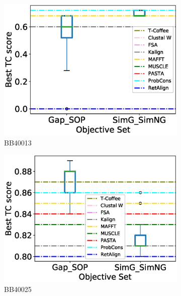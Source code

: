 \begin{figure}[!htbp]
\begin{adjustwidth}{-1.5cm}{-1cm}
\begin{subfigure}{0.22\textwidth}
			\includegraphics[width=\columnwidth]{Figure/summary/precomputedInit/Balibase/BB40013_objset_tc_rank_2}
			\caption{BB40013}
		\end{subfigure}
		\begin{subfigure}{0.22\textwidth}
			\includegraphics[width=\columnwidth]{Figure/summary/precomputedInit/Balibase/BB40025_objset_tc_rank_2}
			\caption{BB40025}
		\end{subfigure}
		\begin{subfigure}{0.22\textwidth}

\end{subfigure}
\end{adjustwidth}
\end{figure}
